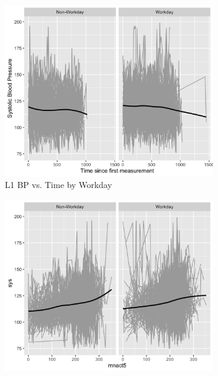 \documentclass[12pt,twoside,letterpaper]{article}
\theoremstyle{definition}
\theoremstyle{definition}
\begin{document}
\begin{appendices}
    \begin{figure} 
        \centering
        \begin{subfigure}{0.32\textwidth}
            \centering
            \includegraphics[width=\textwidth]{pics/bp v time and day facet.png}
            \caption{{\small L1 BP vs. Time by Workday}}
            \label{fig: bp by time and day}
        \end{subfigure}
        \hfill
        \begin{subfigure}{0.32\textwidth}
            \centering
            \includegraphics[width=\textwidth]{pics/bp v act and day facet.png}

\end{subfigure}
\end{figure}
\end{appendices}
\end{document}
